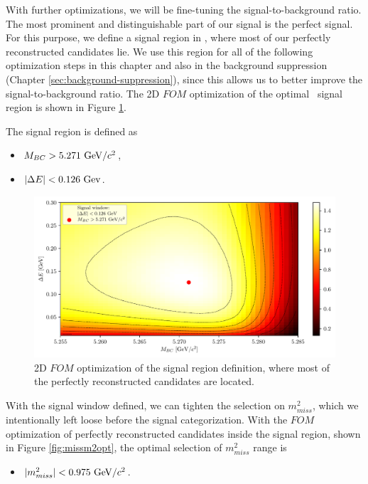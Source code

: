 With further optimizations, we will be fine-tuning the signal-to-background ratio. The most prominent and distinguishable part of our signal is the perfect signal. For this purpose, we define a signal region in \vars, where most of our perfectly reconstructed candidates lie. We use this region for all of the following optimization steps in this chapter and also in the background suppression (Chapter \ref{sec:background-suppression}), since this allows us to better improve the signal-to-background ratio. The 2D $FOM$ optimization of the optimal \vars~signal region is shown in Figure \ref{fig:sigwin}.

The signal region is defined as
\begin{itemize}
	\item $M_{BC} > 5.271\mathrm{~GeV}/c^2$,
	\item $\vert \Delta E \vert < 0.126\mathrm{~Gev}$. 
\end{itemize}

\begin{figure}[H]
	\centering
	\captionsetup{width=0.8\linewidth}
	\includegraphics[width=\linewidth]{fig/sigWin}
	\caption{2D $FOM$ optimization of the signal region definition, where most of the perfectly reconstructed candidates are located.}
	\label{fig:sigwin}
\end{figure}

With the signal window defined, we can tighten the selection on $m_{miss}^2$, which we intentionally left loose before the signal categorization. With the $FOM$ optimization of perfectly reconstructed candidates inside the signal region, shown in Figure \ref{fig:missm2opt}, the optimal selection of $m_{miss}^2$ range is 

\begin{itemize}
	\item $\vert m_{miss}^2 \vert < 0.975\mathrm{~GeV}/c^2$.
\end{itemize}

